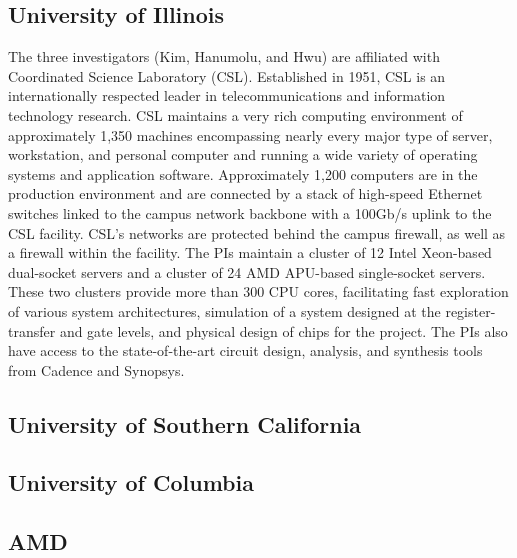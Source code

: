 \subsection{University of Illinois}
The three investigators (Kim, Hanumolu, and Hwu) are affiliated with Coordinated Science Laboratory (CSL). 
Established in 1951, CSL is an internationally respected leader in telecommunications and information technology research. 
CSL maintains a very rich computing environment of approximately 1,350 machines encompassing nearly every major type of server, workstation, and personal computer and running a wide variety of operating systems and application software. 
Approximately 1,200 computers are in the production environment and are connected by a stack of high-speed Ethernet switches linked to the campus network backbone with a 100Gb/s uplink to the CSL facility. 
CSL’s networks are protected behind the campus firewall, as well as a firewall within the facility. 
The PIs maintain a cluster of 12 Intel Xeon-based dual-socket servers and a cluster of 24 AMD APU-based single-socket servers. 
These two clusters provide more than 300 CPU cores, facilitating fast exploration of various system architectures, simulation of a system designed at the register-transfer and gate levels, and physical design of chips for the project.
The PIs also have access to the state-of-the-art circuit design, analysis, and synthesis tools from Cadence and Synopsys.

\subsection{University of Southern California}
\subsection{University of Columbia}

\subsection{AMD}
